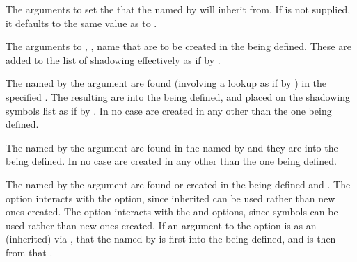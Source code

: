 The arguments to  set the  that the 
named by 
will inherit from. If  is not supplied,
it defaults to the same  value as  to
.
 

The arguments to , , name  
that are to be created in the  being defined.
These  are added to the list of shadowing
 effectively as if by .
 

The  named by the argument 
are found (involving a lookup as if by )
in the specified .  The resulting 
are  into the  being defined, and 
placed on the shadowing symbols list as if by .
In no case are  created in any 
other than the one being defined.
 

The  named by the argument 
are found in the  named by  and 
they are  into the  being defined.
In no case are  created in any 
other than the one being defined.
 

The  named by
the argument   are found 
or created in the  being defined
and .
The  option interacts
with the  option, since inherited  
        can be used rather than new ones created.
The  option interacts
        with the 
 and  options, since 
symbols can be used rather than new ones created.
If an argument to the  option is  as
an (inherited)  via , that the
 named by 
is first  into the  being
defined, and is then  from that .
 
